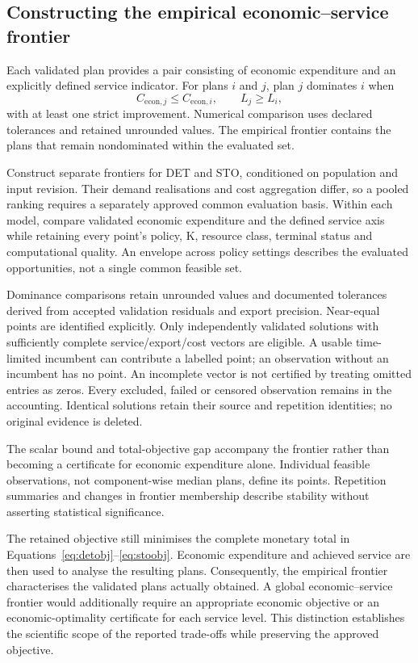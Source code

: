 \documentclass[11pt,a4paper]{article}
\begin{document}
\subsection{Constructing the empirical economic--service frontier}

Each validated plan provides a pair consisting of economic expenditure and an explicitly defined service indicator. For plans $i$ and $j$, plan $j$ dominates $i$ when
\begin{equation}
 C_{\mathrm{econ},j}\le C_{\mathrm{econ},i},
 \qquad L_j\ge L_i,
 \label{eq:dominance}
\end{equation}
with at least one strict improvement. Numerical comparison uses declared tolerances and retained unrounded values. The empirical frontier contains the plans that remain nondominated within the evaluated set.

Construct separate frontiers for DET and STO, conditioned on population and input revision. Their demand realisations and cost aggregation differ, so a pooled ranking requires a separately approved common evaluation basis. Within each model, compare validated economic expenditure and the defined service axis while retaining every point's policy, K, resource class, terminal status and computational quality. An envelope across policy settings describes the evaluated opportunities, not a single common feasible set.

Dominance comparisons retain unrounded values and documented tolerances derived from accepted validation residuals and export precision. Near-equal points are identified explicitly. Only independently validated solutions with sufficiently complete service/export/cost vectors are eligible. A usable time-limited incumbent can contribute a labelled point; an observation without an incumbent has no point. An incomplete vector is not certified by treating omitted entries as zeros. Every excluded, failed or censored observation remains in the accounting. Identical solutions retain their source and repetition identities; no original evidence is deleted.

The scalar bound and total-objective gap accompany the frontier rather than becoming a certificate for economic expenditure alone. Individual feasible observations, not component-wise median plans, define its points. Repetition summaries and changes in frontier membership describe stability without asserting statistical significance.

The retained objective still minimises the complete monetary total in Equations~\ref{eq:detobj}--\ref{eq:stoobj}. Economic expenditure and achieved service are then used to analyse the resulting plans. Consequently, the empirical frontier characterises the validated plans actually obtained. A global economic--service frontier would additionally require an appropriate economic objective or an economic-optimality certificate for each service level. This distinction establishes the scientific scope of the reported trade-offs while preserving the approved objective.
\end{document}
